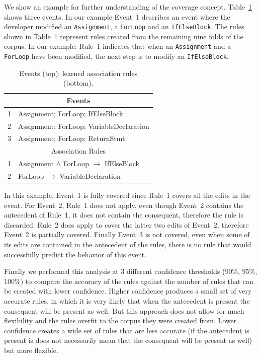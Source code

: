 \documentclass[sigconf]{acmart}
\begin{document}
We show an example for further understanding of the coverage concept.
Table~\ref{rulesandinstances} shows three events. In 
our example Event~1 describes an event
where the developer modified an \texttt{Assignment}, 
a \texttt{ForLoop} and an \texttt{IfElseBlock}.
The rules shown in Table~\ref{rulesandinstances} represent rules created
from the remaining nine folds of the corpus. In our example: Rule~1 
indicates that when an \texttt{Assignment} and a \texttt{ForLoop} 
have been modified,
the next step is to modify an \texttt{IfElseBlock}.

\begin{table}[ht]
  \centering
  \caption{Events (top); learned association rules (bottom). \label{rulesandinstances}}{\small
\begin{tabular}{ll}
\toprule
\multicolumn{2}{c}{Events} \\
\midrule
1 & Assignment; ForLoop; IfElseBlock  \\
2 & Assignment; ForLoop; VariableDeclaration\\  
3 & Assignment; ForLoop;  ReturnStmt \\
\midrule
 \multicolumn{2}{c}{Association Rules} \\                     
\midrule
1 & Assignment $\wedge$ ForLoop $\rightarrow$ IfElseBlock \\  
2 & ForLoop $\rightarrow$ VariableDeclaration \\   
\bottomrule
\end{tabular}
}
\end{table}

In this example, Event~1 is fully covered since Rule~1 covers all
the edits in the event. For Event~2, Rule~1 does not apply, even though
Event~2 contains the antecedent of Rule~1, it does not contain the 
consequent, therefore the rule is discarded. Rule~2 does apply to 
cover the latter two
edits of Event~2,
therefore Event~2 is partially covered. Finally Event~3 is not covered,
even when some of its edits are contained in the antecedent of the rules,
there is no rule that would successfully predict the behavior of this 
event. 

Finally we performed this analysis at 3 different confidence thresholds
(90\%, 95\%, 100\%) to compare the accuracy of the rules against the 
number of rules that can be created with lower confidence. 
Higher confidence produces a small set of very
accurate rules, in which it is very likely that when the antecedent
is present the consequent will be present as well. But this approach
does not allow for much flexibility and the rules overfit to the corpus 
they were created from. Lower 
confidence creates a wide set of rules that are less accurate (if
the antecedent is present is does not necessarily mean that the 
consequent will be present as well) but more flexible. 
\end{document}
